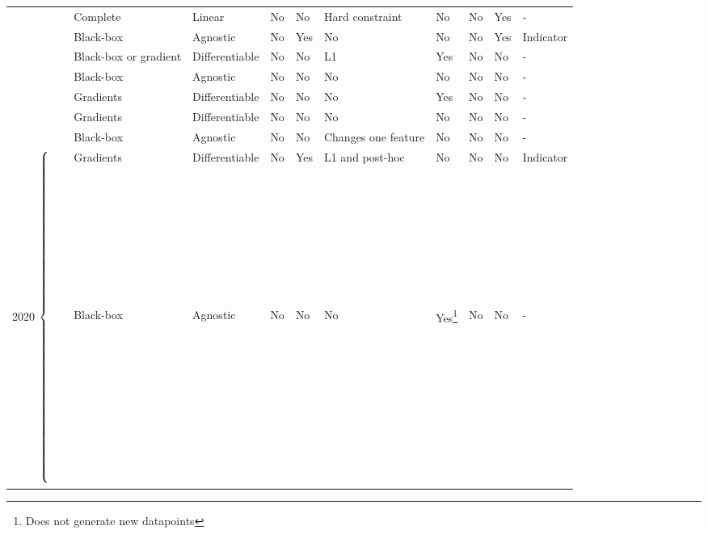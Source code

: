 \begin{table*}
{\begin{tabular}{m{}m{}m{}m{}m{}m{}m{}m{}m{}m{}m{}}
 & \citep{Ustun19:Actionable} & Complete & Linear & No & No & Hard \mbox{constraint} & No & No & Yes & - \\ %
 & \citep{sharma_certifai_2019} & Black-box & Agnostic & No & Yes & No & No & No & Yes & Indicator \\ %
 & \citep{dhurandhar_model_2019} & Black-box or gradient & Differentiable & No & No & L1 & Yes & No & No & - \\ %
 & \citep{rathi-generating:2019} & Black-box & Agnostic & No & No & No & No & No & No & - \\ %
 & \citep{joshi_towards_2019} & Gradients & Differentiable & No & No & No & Yes & No & No & - \\
 & \citep{ramakrishnan_synthesizing_2019} & Gradients & Differentiable & No & No & No & No & No & No & - \\ %
 & \citep{white_measurable_2019,white_measurable_2021_supporting} & Black-box & Agnostic & No & No & Changes one feature & No & No & No & - \\ %
 \multirow{17}{*}{2020 $\begin{dcases*} \\ \\ \\ \\ \\ \\ \\ \\ \\ \\ \\ \\ \\ \\ \\ \\ \\ \\ \\ \\ \end{dcases*}$} & \citep{mothilal_explaining_2020} & Gradients & Differentiable & No & Yes & L1 and post-hoc & No & No & No & Indicator \\ %
 & \citep{poyiadzi_face_2020} & Black-box & Agnostic & No & No & No & Yes\footnote{Does not generate new datapoints} & No & No & - \\ %

\end{tabular}}
\end{table*}
